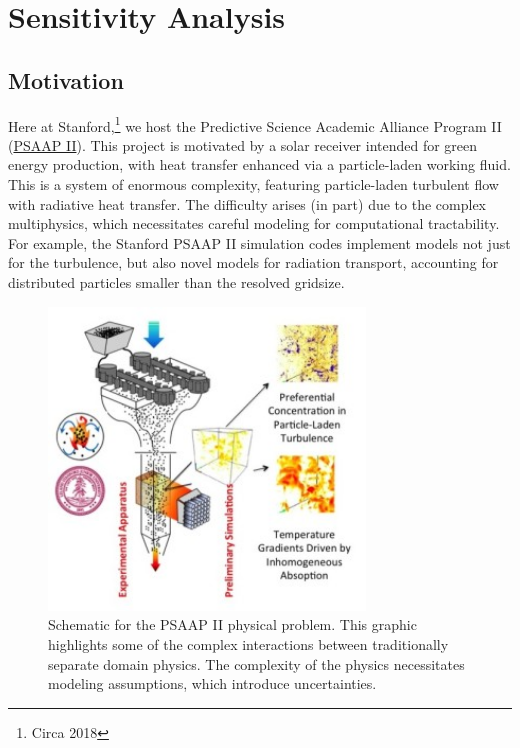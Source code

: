 \documentclass[../primer.tex]{subfiles}
\begin{document}
\chapter{Sensitivity Analysis}

\section{Motivation} \label{sec:orgdc914a7}
Here at Stanford,\footnote{Circa 2018} we host the Predictive Science Academic
Alliance Program II
(\href{http://exascale.stanford.edu/content/stanford-psaap-ii-motivation-1}{PSAAP
  II}). This project is motivated by a solar receiver intended for green energy
production, with heat transfer enhanced via a particle-laden working fluid. This
is a system of enormous complexity, featuring particle-laden turbulent flow with
radiative heat transfer. The difficulty arises (in part) due to the complex
multiphysics, which necessitates careful modeling for computational
tractability. For example, the Stanford PSAAP II simulation codes implement
models not just for the turbulence, but also novel models for radiation
transport, accounting for distributed particles smaller than the resolved
gridsize.

\begin{figure}[!ht]
  \centering
  \includegraphics[width=0.75\textwidth]{./images/psaap}
  \caption{Schematic for the PSAAP II physical problem. This graphic
    highlights some of the complex interactions between traditionally
    separate domain physics. The complexity of the physics necessitates
    modeling assumptions, which introduce uncertainties.}
  \label{fig:psaap}
\end{figure}
\end{document}
